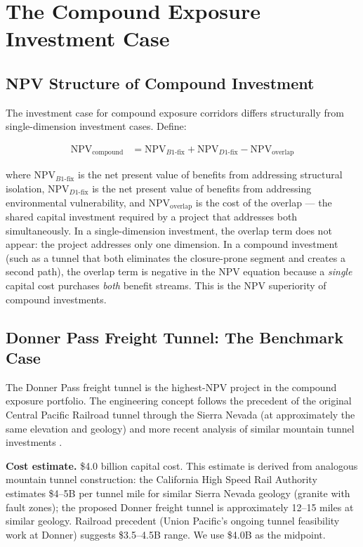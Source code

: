 \section{The Compound Exposure Investment Case}
\label{sec:investment-case}

\subsection{NPV Structure of Compound Investment}

The investment case for compound exposure corridors differs structurally from single-dimension investment cases. Define:

\begin{align}
\text{NPV}_{\text{compound}} &= \text{NPV}_{B1\text{-fix}} + \text{NPV}_{D1\text{-fix}} - \text{NPV}_{\text{overlap}} \label{eq:compound-npv}
\end{align}

where $\text{NPV}_{B1\text{-fix}}$ is the net present value of benefits from addressing structural isolation, $\text{NPV}_{D1\text{-fix}}$ is the net present value of benefits from addressing environmental vulnerability, and $\text{NPV}_{\text{overlap}}$ is the cost of the overlap --- the shared capital investment required by a project that addresses both simultaneously. In a single-dimension investment, the overlap term does not appear: the project addresses only one dimension. In a compound investment (such as a tunnel that both eliminates the closure-prone segment and creates a second path), the overlap term is negative in the NPV equation because a \textit{single} capital cost purchases \textit{both} benefit streams. This is the NPV superiority of compound investments.

\subsection{Donner Pass Freight Tunnel: The Benchmark Case}

The Donner Pass freight tunnel is the highest-NPV project in the compound exposure portfolio. The engineering concept follows the precedent of the original Central Pacific Railroad tunnel through the Sierra Nevada (at approximately the same elevation and geology) and more recent analysis of similar mountain tunnel investments \citep{FHWA_freight2023}.

\textbf{Cost estimate.} \$4.0 billion capital cost. This estimate is derived from analogous mountain tunnel construction: the California High Speed Rail Authority estimates \$4--5B per tunnel mile for similar Sierra Nevada geology (granite with fault zones); the proposed Donner freight tunnel is approximately 12--15 miles at similar geology. Railroad precedent (Union Pacific's ongoing tunnel feasibility work at Donner) suggests \$3.5--4.5B range. We use \$4.0B as the midpoint.

